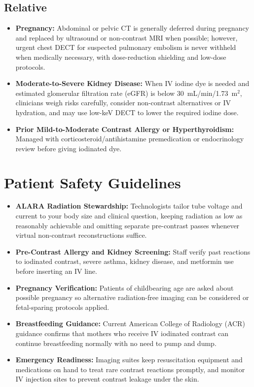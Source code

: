 \subsection{Relative}
\begin{itemize}
\item \textbf{Pregnancy:} Abdominal or pelvic CT is generally deferred during pregnancy and replaced by ultrasound or non-contrast MRI when possible; however, urgent chest DECT for suspected pulmonary embolism is never withheld when medically necessary, with dose-reduction shielding and low-dose protocols.
\item \textbf{Moderate-to-Severe Kidney Disease:} When IV iodine dye is needed and estimated glomerular filtration rate (eGFR) is below 30~mL/min/1.73~m$^2$, clinicians weigh risks carefully, consider non-contrast alternatives or IV hydration, and may use low-keV DECT to lower the required iodine dose.
\item \textbf{Prior Mild-to-Moderate Contrast Allergy or Hyperthyroidism:} Managed with corticosteroid/antihistamine premedication or endocrinology review before giving iodinated dye.
\end{itemize}

\section{Patient Safety Guidelines}
\begin{itemize}
\item \textbf{ALARA Radiation Stewardship:} Technologists tailor tube voltage and current to your body size and clinical question, keeping radiation as low as reasonably achievable and omitting separate pre-contrast passes whenever virtual non-contrast reconstructions suffice.
\item \textbf{Pre-Contrast Allergy and Kidney Screening:} Staff verify past reactions to iodinated contrast, severe asthma, kidney disease, and metformin use before inserting an IV line.
\item \textbf{Pregnancy Verification:} Patients of childbearing age are asked about possible pregnancy so alternative radiation-free imaging can be considered or fetal-sparing protocols applied.
\item \textbf{Breastfeeding Guidance:} Current American College of Radiology (ACR) guidance confirms that mothers who receive IV iodinated contrast can continue breastfeeding normally with no need to pump and dump.
\item \textbf{Emergency Readiness:} Imaging suites keep resuscitation equipment and medications on hand to treat rare contrast reactions promptly, and monitor IV injection sites to prevent contrast leakage under the skin.
\end{itemize}

